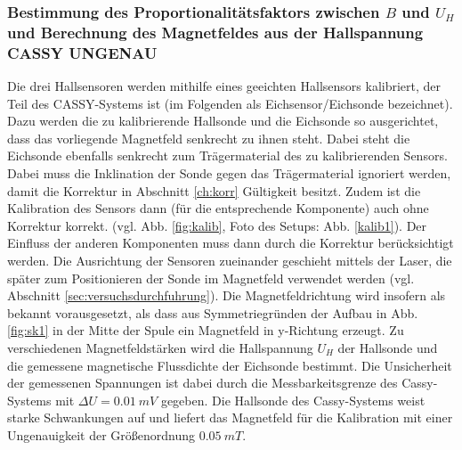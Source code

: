 \documentclass[12pt,a4paper]{article}
\begin{document}
\subsubsection{Bestimmung des Proportionalitätsfaktors zwischen $B$ und $U_H$ und Berechnung des Magnetfeldes aus der Hallspannung CASSY UNGENAU}
Die drei Hallsensoren werden mithilfe eines geeichten Hallsensors kalibriert, der Teil des CASSY-Systems ist (im Folgenden als Eichsensor/Eichsonde bezeichnet). Dazu werden die zu kalibrierende Hallsonde und die Eichsonde so ausgerichtet, dass das vorliegende Magnetfeld senkrecht zu ihnen steht. Dabei steht die Eichsonde ebenfalls senkrecht zum Trägermaterial des zu kalibrierenden Sensors. Dabei muss die Inklination der Sonde gegen das Trägermaterial ignoriert werden, damit die Korrektur in Abschnitt \ref{ch:korr} Gültigkeit besitzt. Zudem ist die Kalibration des Sensors dann (für die entsprechende Komponente) auch ohne Korrektur korrekt. (vgl. Abb. \ref{fig:kalib}, Foto des Setups: Abb. \ref{kalib1}). Der Einfluss der anderen Komponenten muss dann durch die Korrektur berücksichtigt werden. Die Ausrichtung der Sensoren zueinander geschieht mittels der Laser, die später zum Positionieren der Sonde im Magnetfeld verwendet werden (vgl. Abschnitt \ref{sec:versuchsdurchfuhrung}). Die Magnetfeldrichtung wird insofern als bekannt vorausgesetzt, als dass aus Symmetriegründen der Aufbau in Abb. \ref{fig:sk1} in der Mitte der Spule ein Magnetfeld in y-Richtung erzeugt. Zu verschiedenen Magnetfeldstärken wird die Hallspannung $U_H$ der Hallsonde und die gemessene magnetische Flussdichte der Eichsonde bestimmt. Die Unsicherheit der gemessenen Spannungen ist dabei durch die Messbarkeitsgrenze des Cassy-Systems mit $\Delta U = \SI{0.01}{mV}$ gegeben. Die Hallsonde des Cassy-Systems weist starke Schwankungen auf und liefert das Magnetfeld für die Kalibration mit einer Ungenauigkeit der Größenordnung $\SI{0.05}{mT}$.\\
\end{document}
